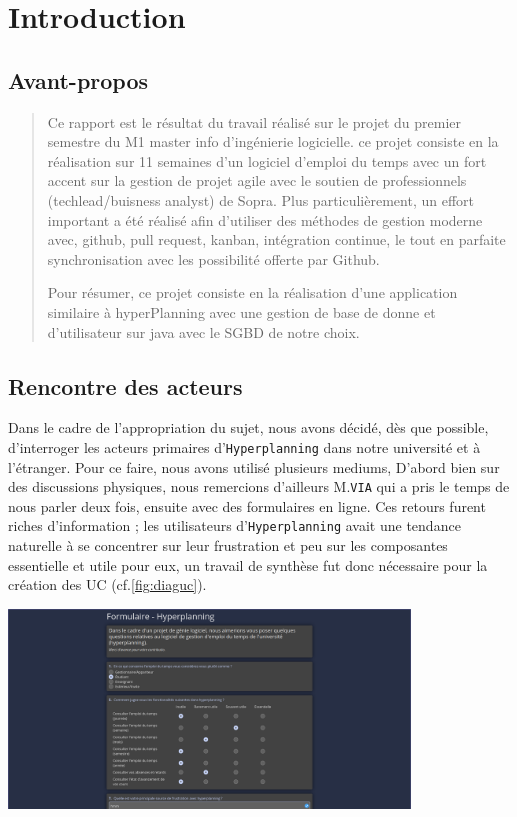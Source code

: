 \documentclass[a4paper,french,final]{memoir}
\begin{document}
\begin{titlingpage}
\hypersetup{pageanchor=false}

\end{titlingpage}
\frontmatter
\tableofcontents
\chapter{Introduction}
\section{Avant-propos}
\begin{quote}
    Ce rapport est le résultat du travail réalisé sur le projet du premier semestre du M1 master info d'ingénierie
logicielle. ce projet consiste en la réalisation sur 11 semaines d'un logiciel d'emploi du temps avec un fort
accent sur la gestion de projet agile avec le soutien de professionnels (techlead/buisness analyst) de Sopra.
Plus particulièrement, un effort important a été réalisé afin d'utiliser des méthodes de gestion
moderne avec, github, pull request, kanban, intégration continue, le tout en parfaite synchronisation avec les
possibilité offerte par Github.


Pour résumer, ce projet consiste en la réalisation d'une application similaire à hyperPlanning avec une gestion
de base de donne et d'utilisateur sur java avec le SGBD de notre choix.
\end{quote}

\section{Rencontre des acteurs}
Dans le cadre de l'appropriation du sujet, nous avons décidé, dès que possible, d'interroger les acteurs primaires
d'\texttt{Hyperplanning} dans notre université et à l'étranger. Pour ce faire, nous avons utilisé plusieurs mediums, D'abord bien sur des discussions physiques, nous remercions d'ailleurs M.\texttt{VIA} qui a pris le temps de nous parler deux fois, ensuite avec des formulaires en ligne. Ces retours furent riches d'information ; les utilisateurs d'\texttt{Hyperplanning}  avait une tendance naturelle à se concentrer sur leur frustration et peu sur les composantes essentielle et utile pour eux, un travail de synthèse fut donc nécessaire pour la création des UC (cf.\ref{fig:diaguc}).
\begin{center}
        \includegraphics[width=0.8\textwidth]{figures/Form.png}
\end{center}
\end{document}
